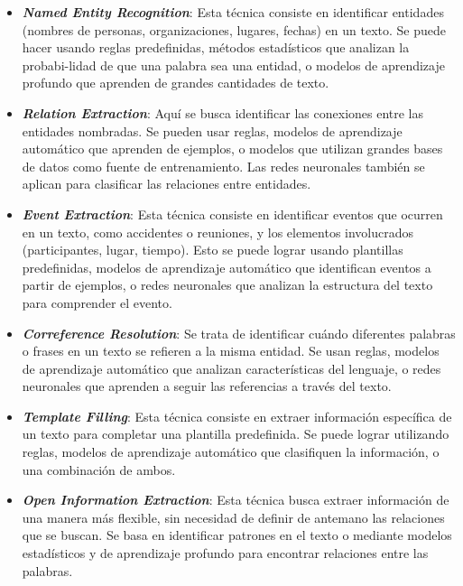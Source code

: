 \begin{itemize}
    \item \textbf{\textit{Named Entity Recognition}}: Esta técnica consiste en identificar 
    entidades (nombres de personas, organizaciones, lugares, fechas) en un texto. 
    Se puede hacer usando reglas predefinidas, métodos estadísticos que analizan 
    la probabi-lidad de que una palabra sea una entidad, o modelos de aprendizaje 
    profundo que aprenden de grandes cantidades de texto.
    \item \textbf{\textit{Relation Extraction}}: Aquí se busca identificar las conexiones 
    entre las entidades nombradas. Se pueden usar reglas, modelos de aprendizaje 
    automático que aprenden de ejemplos, o modelos que utilizan grandes bases de 
    datos como fuente de entrenamiento. Las redes neuronales también se aplican 
    para clasificar las relaciones entre entidades.
    \item \textbf{\textit{Event Extraction}}: Esta técnica consiste en identificar eventos 
    que ocurren en un texto, como accidentes o reuniones, y los elementos 
    involucrados (participantes, lugar, tiempo). Esto se puede lograr usando plantillas 
    predefinidas, modelos de aprendizaje automático que identifican eventos 
    a partir de ejemplos, o redes neuronales que analizan la estructura del texto para 
    comprender el evento.
    \item \textbf{\textit{Correference Resolution}}: Se trata de identificar cuándo diferentes 
    palabras o frases en un texto se refieren a la misma entidad. Se usan reglas, 
    modelos de aprendizaje automático que analizan características del lenguaje, 
    o redes neuronales que aprenden a seguir las referencias a través del texto.
    \item \textbf{\textit{Template Filling}}: Esta técnica consiste en extraer información 
    específica de un texto para completar una plantilla predefinida. Se puede lograr 
    utilizando reglas, modelos de aprendizaje automático que clasifiquen la información, 
    o una combinación de ambos.
    \item \textbf{\textit{Open Information Extraction}}: Esta técnica busca extraer información 
    de una manera más flexible, sin necesidad de definir de antemano las relaciones 
    que se buscan. Se basa en identificar patrones en el texto o mediante modelos 
    estadísticos y de aprendizaje profundo para encontrar relaciones entre las palabras.
\end{itemize}


